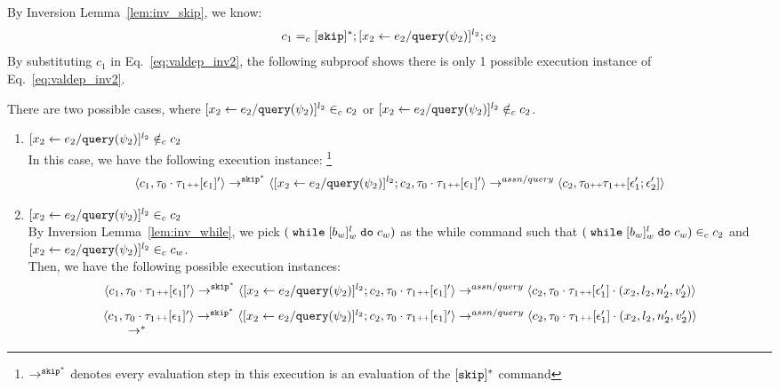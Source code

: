 \begin{subproof}
\[\]
By Inversion Lemma~\ref{lem:inv_skip}, we know:
 \[
 c_1 =_c 
 [\mathtt{skip}]{}^*;[\mathrel{ {x}_2 \leftarrow e_2 / {\tt query}(\psi_2) }]^{l_2};{c}_2
 \]
By substituting $c_1$ in Eq.~\ref{eq:valdep_inv2}, the following subproof shows there is only 1 possible execution instance of Eq.~\ref{eq:valdep_inv2}.
\begin{subproof}[Subproof]
\label{pf:noiteration_inv2}
There are two possible cases, 
where $[\mathrel{ {x}_2 \leftarrow e_2 / {\tt query}(\psi_2) }]^{l_2} \in_c c_2$ 
or $[\mathrel{ {x}_2 \leftarrow e_2 / {\tt query}(\psi_2) }]^{l_2} \notin_c c_2$.
%
\begin{enumerate}
\item{$[\mathrel{ {x}_2 \leftarrow e_2 / {\tt query}(\psi_2) }]^{l_2}\notin_c c_2$}
\\
In this case, we have the following execution instance:
%
\footnote{$\rightarrow^{\mathtt{skip}^*}$ denotes every evaluation step in this execution is an evaluation of the $[\mathtt{skip}]{}^*$ command}
  \[
  \langle c_1, \mathtt{\tau}_0 \cdot \mathtt{\tau}_1 {\scriptscriptstyle ++} [\mathtt{\epsilon}_1]' \rangle 
  \rightarrow^{\mathtt{skip}^*} 
  \langle [\mathrel{ {x}_2 \leftarrow e_2 / {\tt query}(\psi_2) }]^{l_2} ; {c}_2, \mathtt{\tau}_0 \cdot \mathtt{\tau}_1 {\scriptscriptstyle ++} [\mathtt{\epsilon}_1]' \rangle 
  \rightarrow^{assn/query} 
  \langle {c}_2,  \mathtt{\tau}_0 {\scriptscriptstyle ++} \mathtt{\tau}_1 {\scriptscriptstyle ++} [\mathtt{\epsilon}_1'; \mathtt{\epsilon}_2'] \rangle 
 \]
%
\item{$[\mathrel{ {x}_2 \leftarrow e_2 / {\tt query}(\psi_2) }]^{l_2} \in_c c_2$}
\\
By Inversion Lemma~\ref{lem:inv_while}, 
we pick $(\;\mathtt{while}\; [b_w]^l_w \;\mathtt{do}\; c_w)$ 
as the while command such that
$(\;\mathtt{while}\; [b_w]^l_w \;\mathtt{do}\; c_w) \in_c c_2$ and 
$[\mathrel{ {x}_2 \leftarrow e_2 / {\tt query}(\psi_2) }]^{l_2} \in_c c_w$.
\\
Then, we have the following possible execution instances:
  \[
  \langle c_1, \mathtt{\tau}_0 \cdot \mathtt{\tau}_1 {\scriptscriptstyle ++} [\mathtt{\epsilon}_1]' \rangle 
  \rightarrow^{\mathtt{skip}^*} 
  \langle [\mathrel{ {x}_2 \leftarrow e_2 / {\tt query}(\psi_2) }]^{l_2} ; {c}_2, \mathtt{\tau}_0 \cdot \mathtt{\tau}_1 {\scriptscriptstyle ++} [\mathtt{\epsilon}_1]' \rangle 
  \rightarrow^{assn/query} 
  \langle {c}_2,  \mathtt{\tau}_0 \cdot \mathtt{\tau}_1 {\scriptscriptstyle ++} [\mathtt{\epsilon}_1']\cdot (x_2, l_2, n_2', v_2') \rangle 
 \]
%
  \[
  \begin{array}{l}
  \langle c_1, \mathtt{\tau}_0 \cdot \mathtt{\tau}_1 {\scriptscriptstyle ++} [\mathtt{\epsilon}_1]' \rangle 
  \rightarrow^{\mathtt{skip}^*} 
  \langle [\mathrel{ {x}_2 \leftarrow e_2 / {\tt query}(\psi_2) }]^{l_2} ; {c}_2, \mathtt{\tau}_0 \cdot \mathtt{\tau}_1 {\scriptscriptstyle ++} [\mathtt{\epsilon}_1]' \rangle 
  \rightarrow^{assn/query} 
  \langle {c}_2,  \mathtt{\tau}_0 \cdot \mathtt{\tau}_1 {\scriptscriptstyle ++} [\mathtt{\epsilon}_1']\cdot (x_2, l_2, n_2', v_2') \rangle 
  \\ \qquad
  \rightarrow^{*} 

\end{array}\]
\end{enumerate}
\end{subproof}
\end{subproof}

